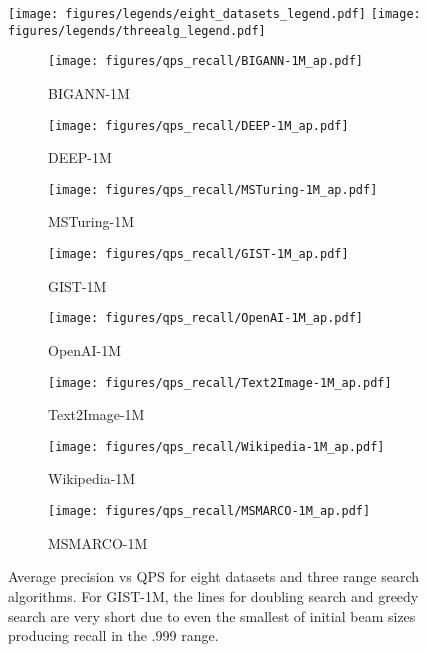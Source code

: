 \begin{figure*}
	\centering
	\texttt{[image: figures/legends/eight\_datasets\_legend.pdf]}
	\texttt{[image: figures/legends/threealg\_legend.pdf]} \\
	\begin{subfigure}{.24\textwidth}
		\texttt{[image: figures/qps\_recall/BIGANN-1M\_ap.pdf]}
		\caption{BIGANN-1M}\label{fig:bigannap}
	\end{subfigure} 
	\begin{subfigure}{.24\textwidth}
		\texttt{[image: figures/qps\_recall/DEEP-1M\_ap.pdf]}
		\caption{DEEP-1M}\label{fig:deepap}
	\end{subfigure}
	\begin{subfigure}{.24\textwidth}
		\texttt{[image: figures/qps\_recall/MSTuring-1M\_ap.pdf]}
		\caption{MSTuring-1M}\label{fig:msturingap}
	\end{subfigure}\hfil
	\begin{subfigure}{.24\textwidth}
		\texttt{[image: figures/qps\_recall/GIST-1M\_ap.pdf]}
		\caption{GIST-1M}\label{fig:gistap}
	\end{subfigure} 
	\begin{subfigure}{.24\textwidth}
		\texttt{[image: figures/qps\_recall/OpenAI-1M\_ap.pdf]}
		\caption{OpenAI-1M}\label{fig:openaiap}
	\end{subfigure}\hfil
	\begin{subfigure}{.24\textwidth}
		\texttt{[image: figures/qps\_recall/Text2Image-1M\_ap.pdf]}
		\caption{Text2Image-1M}\label{fig:t2iap}
	\end{subfigure} 
	\begin{subfigure}{.24\textwidth}
		\texttt{[image: figures/qps\_recall/Wikipedia-1M\_ap.pdf]}
		\caption{Wikipedia-1M}\label{fig:wikiap}
	\end{subfigure}
	\begin{subfigure}{.24\textwidth}
		\texttt{[image: figures/qps\_recall/MSMARCO-1M\_ap.pdf]}
		\caption{MSMARCO-1M}\label{fig:msmarcoap}
	\end{subfigure}
	\caption{Average precision vs QPS for eight datasets and three range search algorithms. For GIST-1M, the lines for doubling search and greedy search are very short due to even the smallest of initial beam sizes producing recall in the .999 range.}
	\label{fig:apgraphseight}
\end{figure*}

